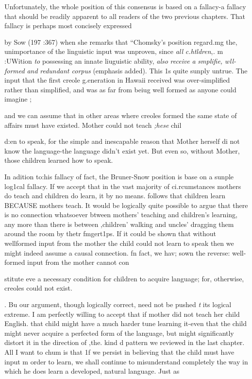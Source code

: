 Unfortunately, the whole position of this consensus is based on a fallacy-a fallacy that should be readily apparent to all readers of the two previous chapters. That fallacy is perhaps most concisely expressed


by Sow (197 :367) when she remarks that ``Chomsky's position regard.mg the, unimportance of the linguistic input was unproven, since \textit{all} \textit{c}\textit{.}\textit{htldren},\textit{.} m :UWition \textit{to} possessing an innate liuguistic ability, \textit{also} \textit{receive} \textit{a} \textit{smplifie,} \textit{wll-formed} \textit{and} \textit{redundant corpus{\textquotedbl}} (emphasis added). This 1s quite sunply untrue. The input that the first creole g.eneration in Hawaii received was over-simplified rather than simpli\-fied, and was as far from beiug well formed as anyone could imagine ;

and we can assume that in other areas where creoles formed the same state of affairs must have existed. Mother could not teach \textit{;}\textit{hese} chil\-

d:en to speak, for the simple and inescapable reason that Mother herself di not know the language-the language didn't exist yet. But even so, without Mother, those children learned how to speak.

In adition to:his fallacy of fact, the Bruner-Snow position is base on a sunple log1cal fallacy. If we accept that in the vast majority of ci.rcumstances mothers do teach and children do learn, it by no means. follows that children learn BECAUSE mothers teach. It would be logically quite possible to argue that there is no connection whatso\-ever btween mothers' teaching and children's learning, any more than there is between ,children' walking and uncles' dragging them around the room by thetr fmgert1ps. If it could be shown that without well\-formed input from the mother the child could not learn to speak then we might indeed assume a causal connection. fn fact, we hav; sown the reverse: well-formed input from the mother cannot con\-

stitute eve a necessary condition for children to acquire language; for, otherwise, creoles could not exist.

. Bu our argument, though logically correct, need not be pushed \textit{t} its logical extreme. I am perfectly willing to accept that if mother did not teach her child English. that child might have a much harder tune learning it-even that the child might never acquire a perfected form of the language, but might significantly distort it in the direction of ,the. kind d pattern we reviewed in the last chapter. All I want to chum is that 1f we persist in believing that the child must have input m order to learn, we shall continue to misunderstand completely the way in which he does learn a developed, natural language. Just as

